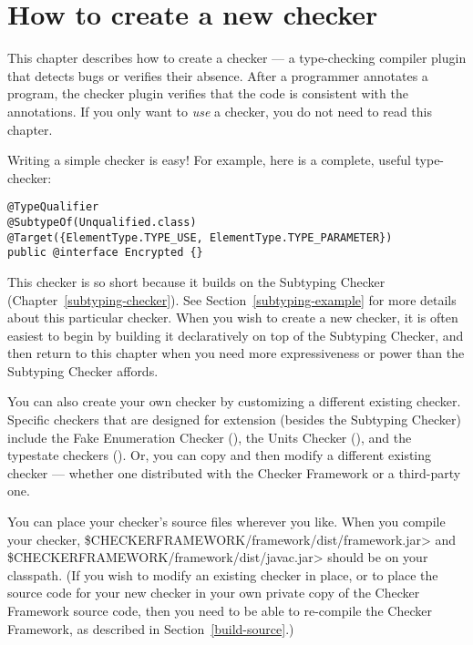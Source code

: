 \htmlhr
\chapter{How to create a new checker\label{writing-a-checker}}

\newcommand{\TreeAPIBase}{https://docs.oracle.com/javase/8/docs/jdk/api/javac/tree/com/sun/source/}
\newcommand{\refTreeclass}[2]{\href{\TreeAPIBase{}/#1/#2.html?is-external=true}{\<#2>}}
\newcommand{\ModelAPIBase}{http://docs.oracle.com/javase/8/docs/api/javax/lang/model/}
\newcommand{\refModelclass}[2]{\href{\ModelAPIBase{}/#1/#2.html?is-external=true}{\<#2>}}

This chapter describes how to create a checker
--- a type-checking compiler plugin that detects bugs or verifies their
absence.  After a programmer annotates a program,
the checker plugin verifies that the code is consistent
with the annotations.
If you only want to \emph{use} a checker, you do not need to read this
chapter.


Writing a simple checker is easy!  For example, here is a complete, useful
type-checker:

\begin{Verbatim}
@TypeQualifier
@SubtypeOf(Unqualified.class)
@Target({ElementType.TYPE_USE, ElementType.TYPE_PARAMETER})
public @interface Encrypted {}
\end{Verbatim}

This checker is so short because it builds on the Subtyping Checker
(Chapter~\ref{subtyping-checker}).
See Section~\ref{subtyping-example} for more details about this particular checker.
When you wish to create a new checker, it is often easiest to begin by
building it declaratively on top of the Subtyping Checker, and then return to
this chapter when you need more expressiveness or power than the Subtyping
Checker affords.

You can also create your own checker by customizing a different existing
checker.  Specific checkers that are designed for extension (besides the Subtyping
Checker) include the Fake Enumeration Checker
(), the Units Checker
(), and the typestate checkers
().
Or, you can copy and then modify a different existing checker --- whether
one distributed with the Checker Framework or a third-party one.

\begin{sloppypar}
You can place your checker's source files wherever you like.  When you
compile your checker, \<\$CHECKERFRAMEWORK/framework/dist/framework.jar> and \<\$CHECKERFRAMEWORK/framework/dist/javac.jar>
should be on your classpath.  (If you wish to modify an existing checker in place,
or to place the source code for your new checker in your own private copy of the
Checker Framework source code, then you need to be able to re-compile the
Checker Framework, as described in Section~\ref{build-source}.)
\end{sloppypar}

